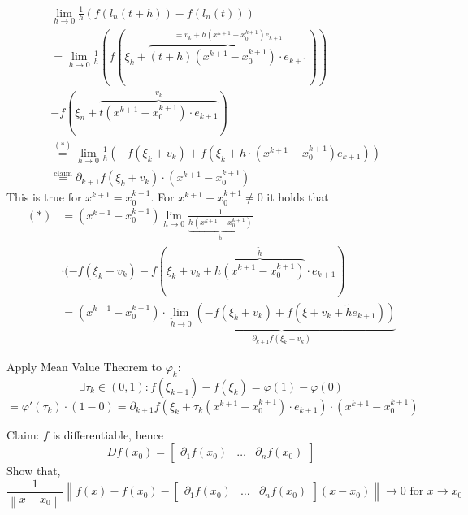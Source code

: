\documentclass[a4paper,landscape,twocolumn]{article}
\theoremstyle{definition}
\newcommand\norm[1]{\left\|#1\right\|}
\begin{document}
\begin{align*}
  &\lim_{h\to0} \frac1{h} \left(f(l_n(t+h)) - f(l_n(t))\right) \\
  &= \lim_{h\to0} \frac1{h} \left(f(\xi_k + \overbrace{(t+h)(x^{k+1} - x_0^{k+1})\cdot e_{k+1}}^{= v_k + h(x^{k+1} - x_0^{k+1}) e_{k+1}})\right) \\
  &- f\left(\xi_n + \overbrace{t(x^{k+1} - x_0^{k+1}) \cdot e_{k+1}}^{v_k}\right) \\
  &\overset{(*)}{=} \lim_{h\to0} \frac1{h} (-f(\xi_k + v_k) + f(\xi_k + h \cdot (x^{k+1} - x_0^{k+1}) e_{k+1})) \\
  &\overset{\text{claim}}{=} \partial_{k+1} f(\xi_k + v_k) \cdot (x^{k+1} - x_0^{k+1})
\end{align*}
This is true for $x^{k+1} = x_0^{k+1}$. For $x^{k+1} - x_0^{k+1} \neq 0$ it holds that
\begin{align*}
  (*) &= (x^{k+1} - x_0^{k+1}) \lim_{h\to0} \frac{1}{\underbrace{h(x^{k+1} - x_0^{k+1})}_{\tilde{h}}} \\
  &\cdot (-f(\xi_k + v_k) - f(\xi_k + v_k + \overbrace{h(x^{k+1} - x_0^{k+1})}^{\tilde{h}} \cdot e_{k+1}) \\
  &= (x^{k+1} - x_0^{k+1}) \cdot \underbrace{\lim_{\tilde{h}\to0} \left(-f(\xi_k + v_k) + f(\xi + v_k + \tilde{h} e_{k+1})\right)}_{\partial_{k+1} f(\xi_k + v_k)}
\end{align*}

Apply Mean Value Theorem to $\varphi_k$:
\[ \exists \tau_k \in (0,1): f(\xi_{k+1}) - f(\xi_k) = \varphi(1) - \varphi(0) \]
\[ = \varphi'(\tau_k) \cdot (1 - 0) = \partial_{k+1} f(\xi_k + \tau_k(x^{k+1} - x_0^{k+1}) \cdot e_{k+1}) \cdot (x^{k+1} - x_0^{k+1}) \]

Claim: $f$ is differentiable, hence
\[ Df(x_0) = \begin{bmatrix} \partial_1 f(x_0) & \ldots & \partial_n f(x_0) \end{bmatrix} \]
Show that,
\[ \frac{1}{\norm{x - x_0}} \norm{f(x) - f(x_0) - \begin{bmatrix} \partial_1 f(x_0) & \ldots & \partial_n f(x_0) \end{bmatrix} (x - x_0)} \to 0 \text{ for } x \to x_0 \]
\end{document}
